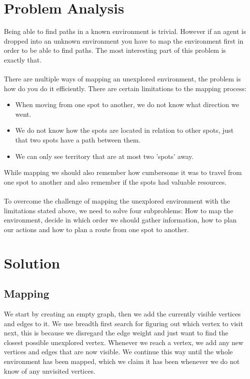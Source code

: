 \documentclass[11pt]{report}
\begin{document}
\section*{Problem Analysis}
Being able to find paths in a known environment is trivial. However if an agent is dropped into an unknown environment you have to map the environment first in order to be able to find paths. The most interesting part of this problem is exactly that.\\
\\
There are multiple ways of mapping an unexplored environment, the problem is how do you do it efficiently. There are certain limitations to the mapping process:
\begin{itemize}
	\item When moving from one spot to another, we do not know what direction we went.
	\item We do not know how the spots are located in relation to other spots, just that two spots have a path between them.
	\item We can only see territory that are at most two 'spots' away.
\end{itemize}
While mapping we should also remember how cumbersome it was to travel from one spot to another and also remember if the spots had valuable resources.\\
\\
To overcome the challenge of mapping the unexplored environment with the limitations stated above, we need to solve four subproblems: How to map the environment, decide in which order we should gather information, how to plan our actions and how to plan a route from one spot to another.

\section*{Solution}
\subsection*{Mapping}
We start by creating an empty graph, then we add the currently visible vertices and edges to it. We use breadth first search for figuring out which vertex to visit next, this is because we disregard the edge weight and just want to find the closest possible unexplored vertex. Whenever we reach a vertex, we add any new vertices and edges that are now visible. We continue this way until the whole environment has been mapped, which we claim it has been whenever we do not know of any unvisited vertices.
\end{document}
